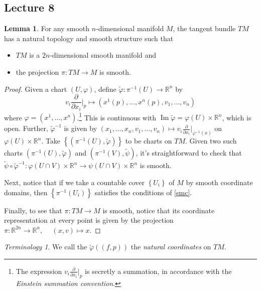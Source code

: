\documentclass[10pt,letterpaper,cm]{nupset}
\theoremstyle{definition}
\theoremstyle{theorem}
\newtheorem{lemma}[definition]{Lemma}
\theoremstyle{remark}
\newtheorem*{term}{Terminology}
\DeclareMathOperator{\Ima}{Im}
\newcommand{\R}{\mathbb R}
\newcommand{\1}{\mathbf{1}}
\newcommand{\0}{\vec 0}
\begin{document}
\subsection{Lecture 8}

\begin{lemma}
For any smooth $n$-dimensional manifold $M$, the tangent bundle $TM$ has a natural topology and smooth structure such that 
\begin{itemize}
\item $TM$ is a $2n$-dimensional smooth manifold and 
\item the projection $\pi : TM \to M$ is smooth.
\end{itemize}
\end{lemma}
\begin{proof}
Given a chart $\left(U, \varphi\right)$, define $\tilde{\varphi}: \pi^{-1}(U) \to \R^n$ by $$v_i\frac{\partial}{\partial{x_i}}\bigr\rvert_p \mapsto \left(x^1(p), \ldots, x^n(p), v_1, \ldots, v_n\right)$$ where $\varphi = (x^1, \ldots, x^n)$.\footnote{The expression $v_i\frac{\partial}{\partial{x_i}}\bigr\rvert_p$ is secretly a summation, in accordance with the \textit{Einstein summation convention}.}
This is continuous with $\Ima \tilde{\varphi} = \varphi(U) \times \R^n$, which is open. Further, $\tilde{\varphi}^{-1}$ is given by $\left(x_1, \ldots, x_n, v_1, \ldots, v_n\right)\mapsto v_i \frac{\partial}{\partial{x_i}}\bigr\rvert_{\varphi^{-1}(x)}$ on  $\varphi(U) \times \R^n$. Take $\left\{\left(\pi^{-1}(U), \tilde{\varphi}\right)\right\}$ to be charts on $TM$. Given two such charts $\left(\pi^{-1}(U), \tilde{\varphi}\right)$ and $\left(\pi^{-1}(V), \tilde{\psi}\right)$, it's straightforward to check that $\tilde{\psi} \circ \tilde{\varphi}^{-1}: \varphi(U \cap V)\times \R^n \to \psi(U \cap V)\times \R^n$ is smooth.

\medskip


Next, notice that if we take a countable cover $\left\{U_i\right\}$ of $M$ by smooth coordinate domains, then $\left\{\pi^{-1}(U_i)\right\}$ satisfies the conditions of \cref{smc}.

\medskip


Finally, to see that $\pi : TM \to M$ is smooth, notice that its coordinate representation at every point is given by the projection $\pi:\R^{2n} \to \R^n, \ \quad (x,v) \mapsto x$.
\end{proof}

\begin{term}
We call the $\tilde{\varphi}\left((f, p)\right)$ the \textit{natural coordinates} on $TM$.
\end{term}
\end{document}
